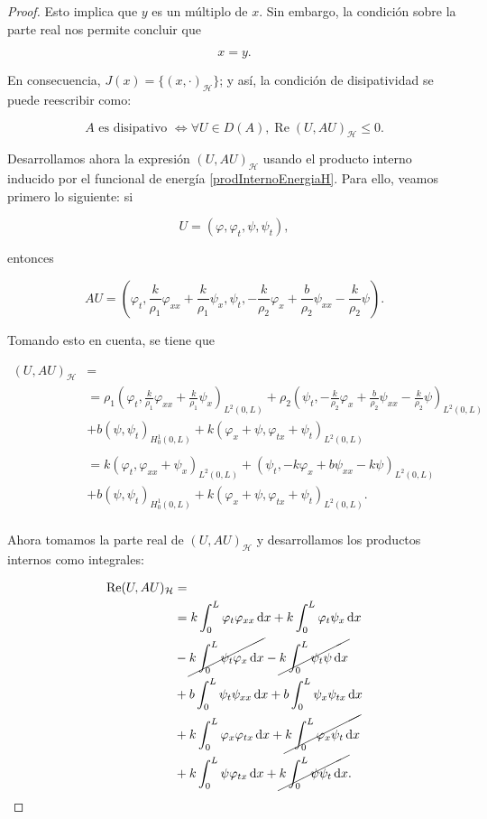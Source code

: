 \begin{proof}
    Esto implica que $y$ es un múltiplo de $x$. Sin embargo, la condición sobre la parte real nos permite concluir que

    \[x = y.\]

    En consecuencia, $J(x) = \{(x, \cdot)_{\mathcal{H}}\}$; y así, la condición de disipatividad se puede reescribir como:

    \[A \text{ es disipativo } \iff \forall U \in D(A), \operatorname{Re}(U, AU)_{\mathcal{H}} \leq 0.\]

    Desarrollamos ahora la expresión $(U,AU)_{\mathcal{H}}$ usando el producto interno inducido por el funcional de energía \eqref{prodInternoEnergiaH}. Para ello, veamos primero lo siguiente: si

    \[U = (\varphi, \varphi_t, \psi, \psi_t),\]

    entonces

    \[AU = \left(\varphi_t, \frac{k}{\rho_1}\varphi_{xx} + \frac{k}{\rho_1}\psi_x, \psi_t, -\frac{k}{\rho_2}\varphi_x + \frac{b}{\rho_2}\psi_{xx} - \frac{k}{\rho_2}\psi \right).\]

    Tomando esto en cuenta, se tiene que

    \begin{align*}
        (U,AU)_{\mathcal{H}} &=\\
        &=\rho_1\left(\varphi_t, \frac{k}{\rho_1}\varphi_{xx} + \frac{k}{\rho_1}\psi_x \right)_{L^2(0,L)} + \rho_2\left(\psi_t, -\frac{k}{\rho_2}\varphi_x + \frac{b}{\rho_2}\psi_{xx} - \frac{k}{\rho_2}\psi \right)_{L^2(0,L)}
        \\&+ b(\psi, \psi_t)_{H_0^1(0,L)} + k(\varphi_x + \psi, \varphi_{tx} + \psi_t)_{L^2(0,L)}\\\\
        &=k\left(\varphi_t, \varphi_{xx} + \psi_x \right)_{L^2(0,L)} + \left(\psi_t, -k\varphi_x + b\psi_{xx} - k\psi \right)_{L^2(0,L)}
        \\&+ b(\psi, \psi_t)_{H_0^1(0,L)} + k(\varphi_x + \psi, \varphi_{tx} + \psi_t)_{L^2(0,L)}.\\
    \end{align*}

    Ahora tomamos la parte real de $(U,AU)_{\mathcal{H}}$ y desarrollamos los productos internos como integrales:

    \begin{align*}
        \operatorname{Re}(U,AU)_{\mathcal{H}} &=\\
        &= k\int_0^L \varphi_t \varphi_{xx} \, \mathrm{d} x + k\int_0^L\varphi_t \psi_x \, \mathrm{d} x\\
        &- \cancel{k\int_0^L\psi_t \varphi_x \, \mathrm{d} x} - \cancel{k\int_0^L \psi_t \psi \, \mathrm{d} x}\\
        &+ b\int_0^L \psi_t \psi_{xx} \, \mathrm{d} x + b \int_0^L \psi_x \psi_{tx} \, \mathrm{d} x\\
        &+ k\int_0^L \varphi_x \varphi_{tx} \, \mathrm{d} x + \cancel{k\int_0^L\varphi_x \psi_t \, \mathrm{d} x}\\
        &+ k\int_0^L \psi \varphi_{tx} \, \mathrm{d} x + \cancel{k\int_0^L \psi \psi_t \, \mathrm{d} x}.
    \end{align*}


\end{proof}
